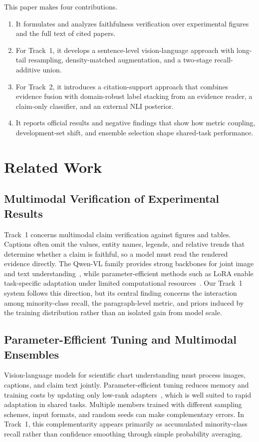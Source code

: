 \documentclass[runningheads]{llncs}
\begin{document}
This paper makes four contributions.
\begin{enumerate}
\setlength{\itemsep}{0pt}
\setlength{\parsep}{0pt}
\item It formulates and analyzes faithfulness verification over experimental figures and the full text of cited papers.
\item For Track~1, it develops a sentence-level vision-language approach with long-tail resampling, density-matched augmentation, and a two-stage recall-additive union.
\item For Track~2, it introduces a citation-support approach that combines evidence fusion with domain-robust label stacking from an evidence reader, a claim-only classifier, and an external NLI posterior.
\item It reports official results and negative findings that show how metric coupling, development-set shift, and ensemble selection shape shared-task performance.
\end{enumerate}

\section{Related Work}

\subsection{Multimodal Verification of Experimental Results}
Track~1 concerns multimodal claim verification against figures and tables. Captions often omit the values, entity names, legends, and relative trends that determine whether a claim is faithful, so a model must read the rendered evidence directly. The Qwen-VL family provides strong backbones for joint image and text understanding~\cite{qwen3vl2025}, while parameter-efficient methods such as LoRA enable task-specific adaptation under limited computational resources~\cite{hu2021lora}. Our Track~1 system follows this direction, but its central finding concerns the interaction among minority-class recall, the paragraph-level metric, and priors induced by the training distribution rather than an isolated gain from model scale.

\subsection{Parameter-Efficient Tuning and Multimodal Ensembles}
Vision-language models for scientific chart understanding must process images, captions, and claim text jointly. Parameter-efficient tuning reduces memory and training costs by updating only low-rank adapters~\cite{hu2021lora}, which is well suited to rapid adaptation in shared tasks. Multiple members trained with different sampling schemes, input formats, and random seeds can make complementary errors. In Track~1, this complementarity appears primarily as accumulated minority-class recall rather than confidence smoothing through simple probability averaging.
\end{document}
